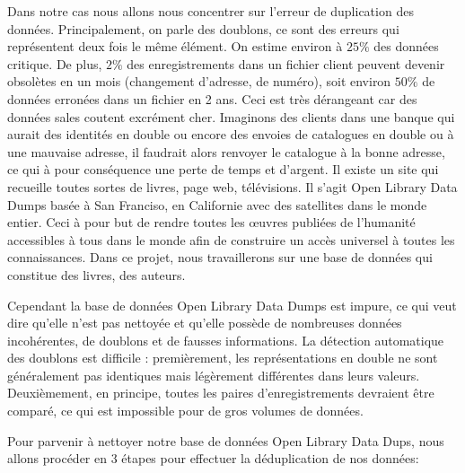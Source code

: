 \documentclass[12pt, openany]{article}
\begin{document}
\pagebreak

Dans notre cas nous allons nous concentrer sur l'erreur de duplication des données.
Principalement, on parle des doublons, ce sont des erreurs qui représentent deux fois le même élément.  On estime environ à $ 25\% $  des données critique.  De plus, $ 2\% $ des enregistrements dans un fichier client peuvent devenir obsolètes en un mois (changement d’adresse, de numéro), soit environ $50\%$ de données erronées dans un fichier en 2 ans. Ceci est très dérangeant car des données sales coutent excrément cher.
Imaginons des clients dans une banque qui aurait des identités en double ou encore des envoies de catalogues en double ou à une mauvaise adresse, il faudrait alors renvoyer le catalogue à la bonne adresse, ce qui à pour conséquence une perte de temps et d'argent.
Il existe un site qui recueille toutes sortes de livres, page web, télévisions. Il s’agit Open Library Data Dumps basée à San Franciso, en Californie avec des satellites dans le monde entier.  Ceci à pour but de rendre toutes les œuvres publiées de l’humanité accessibles à tous dans le monde afin de construire un accès universel à toutes les connaissances.
Dans ce projet, nous travaillerons sur une base de données qui constitue des livres, des auteurs.

\bigskip


  


Cependant la base de données Open Library Data Dumps est impure, ce qui veut dire qu’elle n’est pas nettoyée et qu’elle possède de nombreuses données incohérentes, de doublons et de fausses informations.
La détection automatique des doublons est difficile : premièrement, les représentations en double ne sont généralement pas identiques mais légèrement différentes dans leurs valeurs. Deuxièmement, en principe, toutes les paires d'enregistrements devraient être comparé, ce qui est impossible pour de gros volumes de données.


\bigskip


\pagebreak

Pour parvenir à nettoyer notre base de données Open Library Data Dups, nous allons procéder en 3 étapes pour effectuer la déduplication de nos données:
\end{document}
